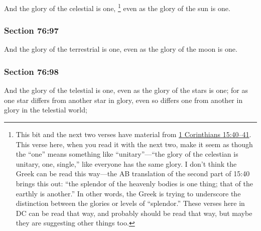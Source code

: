 		And the glory of the celestial is one,%
			\footnote{%
				This bit and the next two verses have material from \hyperref[1CORINTHIANS-15-40]{1 Corinthians 15:40--41}. This verse here, when you read it with the next two, make it seem as though the ``one'' means something like ``unitary''---``the glory of the celestian is unitary, one, single,'' like everyone has the same glory. I don't think the Greek can be read this way---the AB translation of the second part of 15:40 brings this out: ``the splendor of the heavenly bodies is one thing; that of the earthly is another.'' In other words, the Greek is trying to underscore the distinction between the glories or levels of ``splendor.'' These verses here in DC can be read that way, and probably should be read that way, but maybe they are suggesting other things too.
				}
		even as the glory of the sun is one.


	\subsubsection{Section 76:97} %
		\label{DC76-97}

		And the glory of the terrestrial is one, even as the glory of the moon is one.


	\subsubsection{Section 76:98} %
		\label{DC76-98}

		And the glory of the telestial is one, even as the glory of the stars is one; for as one star differs from another star in glory, even so differs one from another in glory in the telestial world;

